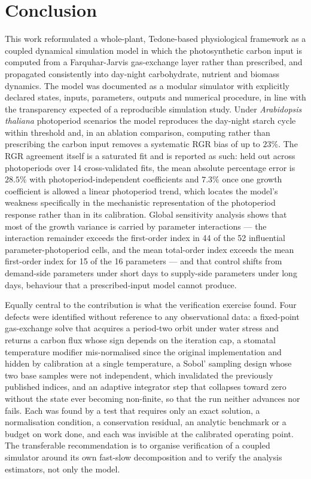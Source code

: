 \documentclass[a4paper,fleqn]{cas-sc}
\begin{document}
\section{Conclusion}
\label{sec:conclusion}

This work reformulated a whole-plant, Tedone-based physiological framework as a coupled dynamical simulation model in which the photosynthetic carbon input is computed from a Farquhar-Jarvis gas-exchange layer rather than prescribed, and propagated consistently into day-night carbohydrate, nutrient and biomass dynamics. The model was documented as a modular simulator with explicitly declared states, inputs, parameters, outputs and numerical procedure, in line with the transparency expected of a reproducible simulation study. Under \textit{Arabidopsis thaliana} photoperiod scenarios the model reproduces the day-night starch cycle within threshold and, in an ablation comparison, computing rather than prescribing the carbon input removes a systematic RGR bias of up to $23\%$. The RGR agreement itself is a saturated fit and is reported as such: held out across photoperiods over 14 cross-validated fits, the mean absolute percentage error is $28.5\%$ with photoperiod-independent coefficients and $7.3\%$ once one growth coefficient is allowed a linear photoperiod trend, which locates the model's weakness specifically in the mechanistic representation of the photoperiod response rather than in its calibration. Global sensitivity analysis shows that most of the growth variance is carried by parameter interactions --- the interaction remainder exceeds the first-order index in 44 of the 52 influential parameter-photoperiod cells, and the mean total-order index exceeds the mean first-order index for 15 of the 16 parameters --- and that control shifts from demand-side parameters under short days to supply-side parameters under long days, behaviour that a prescribed-input model cannot produce.

Equally central to the contribution is what the verification exercise found. Four defects were identified without reference to any observational data: a fixed-point gas-exchange solve that acquires a period-two orbit under water stress and returns a carbon flux whose sign depends on the iteration cap, a stomatal temperature modifier mis-normalised since the original implementation and hidden by calibration at a single temperature, a Sobol' sampling design whose two base samples were not independent, which invalidated the previously published indices, and an adaptive integrator step that collapses toward zero without the state ever becoming non-finite, so that the run neither advances nor fails. Each was found by a test that requires only an exact solution, a normalisation condition, a conservation residual, an analytic benchmark or a budget on work done, and each was invisible at the calibrated operating point. The transferable recommendation is to organise verification of a coupled simulator around its own fast-slow decomposition and to verify the analysis estimators, not only the model.
\end{document}
